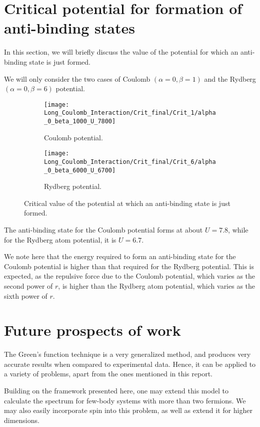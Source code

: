 \documentclass[a4paper, 11pt]{report}
\begin{document}
\section{Critical potential for formation of anti-binding states}
In this section, we will briefly discuss the value of the potential for which an anti-binding state is just formed.

We will only consider the two cases of Coulomb $\left(\alpha = 0, \beta = 1\right)$ and the Rydberg $\left(\alpha = 0, \beta = 6\right)$ potential.

\begin{figure}[h!]
\centering
\begin{subfigure}{0.4\linewidth}
\texttt{[image: Long\_Coulomb\_Interaction/Crit\_final/Crit\_1/alpha\_0\_beta\_1000\_U\_7800]}
\caption{Coulomb potential.}
\label{fig:alpha0beta1000u7800}
\end{subfigure}
\begin{subfigure}{0.4\linewidth}
\texttt{[image: Long\_Coulomb\_Interaction/Crit\_final/Crit\_6/alpha\_0\_beta\_6000\_U\_6700]}
\caption{Rydberg potential.}
\label{fig:alpha0beta6000u6700}
\end{subfigure}
\caption{Critical value of the potential at which an anti-binding state is just formed.}
\end{figure}

The anti-binding state for the Coulomb potential forms at about $U = 7.8$, while for the Rydberg atom potential, it is $U = 6.7$.

We note here that the energy required to form an anti-binding state for the Coulomb potential is higher than that required for the Rydberg potential. This is expected, as the repulsive force due to the Coulomb potential, which varies as the second power of $r$, is higher than the Rydberg atom potential, which varies as the sixth power of $r$.

\section{Future prospects of work}
The Green's function technique is a very generalized method, and produces very accurate results when compared to experimental data. Hence, it can be applied to a variety of problems, apart from the ones mentioned in this report.

Building on the framework presented here, one may extend this model to calculate the spectrum for few-body systems with more than two fermions. We may also easily incorporate spin into this problem, as well as extend it for higher dimensions.
\end{document}
